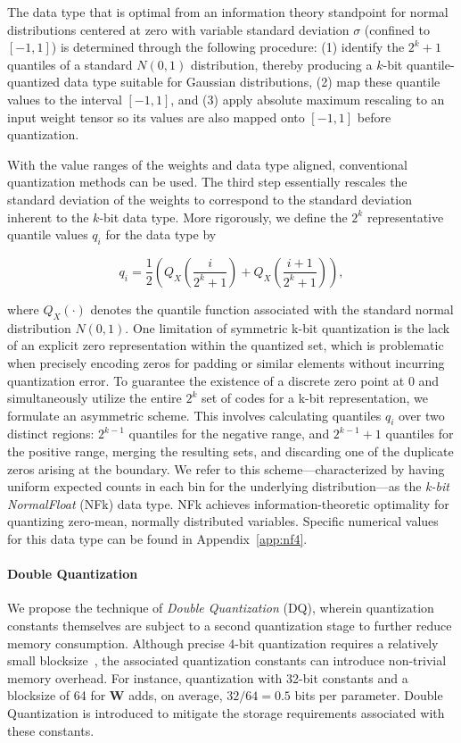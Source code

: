 The data type that is optimal from an information theory standpoint for normal distributions centered at zero with variable standard deviation $\sigma$ (confined to $[-1, 1]$) is determined through the following procedure: (1) identify the $2^k+1$ quantiles of a standard $N(0,1)$ distribution, thereby producing a $k$-bit quantile-quantized data type suitable for Gaussian distributions, (2) map these quantile values to the interval $[-1, 1]$, and (3) apply absolute maximum rescaling to an input weight tensor so its values are also mapped onto $[-1, 1]$ before quantization.

With the value ranges of the weights and data type aligned, conventional quantization methods can be used. The third step essentially rescales the standard deviation of the weights to correspond to the standard deviation inherent to the $k$-bit data type. More rigorously, we define the $2^k$ representative quantile values $q_i$ for the data type by

\begin{equation}
q_i  = \frac{1}{2}\left( Q_X\left(\frac{i}{2^k+1}\right) + Q_X\left(\frac{i+1}{2^k+1}\right)\right),
\end{equation}

where $Q_X(\cdot)$ denotes the quantile function associated with the standard normal distribution $N(0,1)$. One limitation of symmetric k-bit quantization is the lack of an explicit zero representation within the quantized set, which is problematic when precisely encoding zeros for padding or similar elements without incurring quantization error. To guarantee the existence of a discrete zero point at $0$ and simultaneously utilize the entire $2^k$ set of codes for a k-bit representation, we formulate an asymmetric scheme. This involves calculating quantiles $q_i$ over two distinct regions: $2^{k-1}$ quantiles for the negative range, and $2^{k-1}+1$ quantiles for the positive range, merging the resulting sets, and discarding one of the duplicate zeros arising at the boundary. We refer to this scheme—characterized by having uniform expected counts in each bin for the underlying distribution—as the \emph{k-bit NormalFloat} (NFk) data type. NFk achieves information-theoretic optimality for quantizing zero-mean, normally distributed variables. Specific numerical values for this data type can be found in Appendix~\ref{app:nf4}.

\paragraph{Double Quantization{}} 
We propose the technique of \emph{Double Quantization} (DQ), wherein quantization constants themselves are subject to a second quantization stage to further reduce memory consumption. Although precise 4-bit quantization requires a relatively small blocksize~\citep{dettmers2022case}, the associated quantization constants can introduce non-trivial memory overhead. For instance, quantization with 32-bit constants and a blocksize of 64 for $\mathbf{W}$ adds, on average, $32/64 = 0.5$ bits per parameter. Double Quantization is introduced to mitigate the storage requirements associated with these constants.


